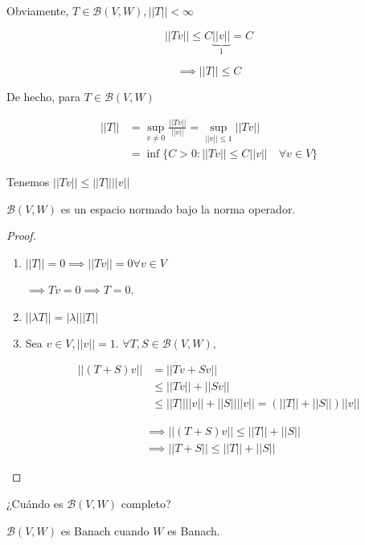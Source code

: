 Obviamente, $T\in \mathcal{B}(V,W), ||T||<\infty$

\[||Tv||\leq C \underbrace{||v||}_1=C\]

\[\implies ||T||\leq C\]

De hecho, para $T\in \mathcal{B}(V,W)$

\begin{align*}
    ||T||&=\sup_{v\neq 0} \frac{||Tv||}{||v||}=\sup_{||v||\leq 1} ||Tv||\\
    &=\inf \{C>0:||Tv||\leq C||v||\quad \forall v\in V\}
\end{align*}

Tenemos $||Tv||\leq ||T||||v||$

\begin{ftheorem}
    $\mathcal{B}(V,W)$ es un espacio normado bajo la norma operador.
\end{ftheorem}

\begin{proof}
    \begin{enumerate}
        \item $||T||=0\implies ||Tv||=0\forall v\in V$
         
        $\implies Tv=0\implies T=0$.

        \item $||\lambda T||=|\lambda| ||T||$

        \item Sea $v\in V,||v||=1$. $\forall T,S\in\mathcal{B}(V,W),$
        
        \begin{align*}||(T+S)v||&=||Tv+Sv||\\
        &\leq ||Tv||+||Sv||\\
        &\leq ||T|| ||v||+||S|| ||v||=(||T||+||S||)||v||\end{align*}

    \begin{align*}
        &\implies ||(T+S)v||\leq ||T||+||S||\\
        &\implies ||T+S||\leq ||T||+||S||
    \end{align*}
    \end{enumerate}
\end{proof}

    ¿Cuándo es $\mathcal{B}(V,W)$ completo?

    \begin{ftheorem}
        $\mathcal{B}(V,W)$ es Banach cuando $W$ es Banach.
    \end{ftheorem}

